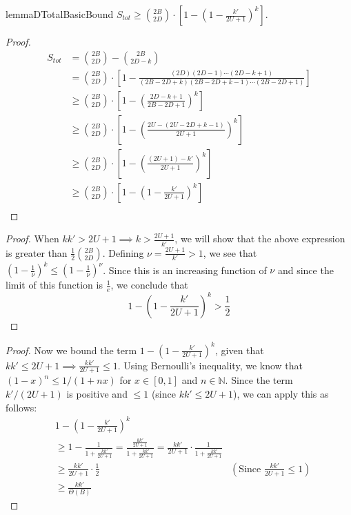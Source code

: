 \begin{restatable}{lemma}{DTotalBasicBound}
\label{lem:DTotalBasicBound}
$S_{tot} \ge {{2B}\choose{2D}}\cdot \left[1-\left(1 - \frac{k'}{2U+1}\right)^k\right]$.
\end{restatable}
\begin{proof}
\begin{align}
S_{tot} &= {{2B}\choose{2D}}-{{2B}\choose{2D-k}}\\
&= {{2B}\choose{2D}}\cdot \left[1-\frac{(2D)(2D-1)\cdots(2D-k+1)}{(2B-2D+k)(2B-2D+k-1)\cdots(2B-2D+1)}\right]\\
&\ge {{2B}\choose{2D}}\cdot \left[1-\left(\frac{2D-k+1}{2B-2D+1}\right)^k\right]\\
&\ge {{2B}\choose{2D}}\cdot \left[1-\left(\frac{2U-(2U-2D+k-1)}{2U+1}\right)^k\right]\\
&\ge {{2B}\choose{2D}}\cdot \left[1-\left(\frac{(2U+1)-k'}{2U+1}\right)^k\right]\\
&\ge {{2B}\choose{2D}}\cdot \left[1-\left(1 - \frac{k'}{2U+1}\right)^k\right]\\
\end{align}
\end{proof}

\DTotalFarBoundary*
\begin{proof}
When $kk' > 2U + 1 \implies k > \frac{2U+1}{k'}$,
we will show that the above expression is greater than $\frac 12 \binom{2B}{2D}$.
Defining $\nu = \frac{2U+1}{k'} > 1$, we see that $(1-\frac 1\nu)^k \le (1-\frac 1\nu)^\nu$.
Since this is an increasing function of $\nu$ and since the limit of this function is $\frac 1e$,
we conclude that
\[
1-\left(1 - \frac{k'}{2U+1}\right)^k > \frac 12
\]
\end{proof}

\DTotalNearBoundary*
\begin{proof}
Now we bound the term $1-\left(1-\frac{k'}{2U+1}\right)^k$, given that $kk'\le 2U+1\implies\frac{kk'}{2U+1} \le 1$.
Using Bernoulli's inequality, we know that $(1 - x)^n \le 1/(1+nx)$ for $x\in [0, 1]$ and $n\in \mathbb N$.
Since the term $k'/(2U+1)$ is positive and $\le 1$ (since $kk' \le 2U+1$), we can apply this as follows:
\begin{align}
&1 - \left(1 - \frac{k'}{2U+1}\right)^k\\
&\ge 1 - \frac{1}{1 + \frac{kk'}{2U+1} } = \frac{\frac{kk'}{2U+1}}{1 + \frac{kk'}{2U+1} } = \frac{kk'}{2U+1}\cdot \frac{1}{1 + \frac{kk'}{2U+1}} \\
&\ge \frac{kk'}{2U+1}\cdot \frac{1}{2} &\left( \textrm{Since }\frac{kk'}{2U+1}\le 1\right) \\
&\ge \frac{kk'}{\Theta(B)}
\end{align}
\end{proof}




